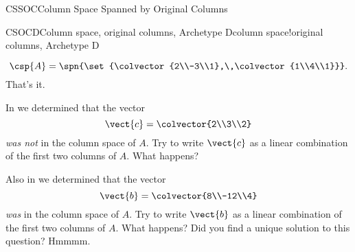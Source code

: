 \begin{subsect}{CSSOC}{Column Space Spanned by Original Columns}
\begin{example}{CSOCD}{Column space, original columns, Archetype D}{column space!original columns,  Archetype D}
\begin{para}
\begin{equation*}
\csp{A}=\spn{\set{\colvector{2\\-3\\1},\,\colvector{1\\4\\1}}}.
\end{equation*}
%
That's it.\end{para}
%
\begin{para}In  we determined that the vector
%
\begin{equation*}
\vect{c}=\colvector{2\\3\\2}
\end{equation*}
%
{\em was not} in the column space of $A$.  Try to write $\vect{c}$ as a linear combination of the first two columns of $A$.  What happens?\end{para}
%
\begin{para}Also in  we determined that the vector
%
\begin{equation*}
\vect{b}=\colvector{8\\-12\\4}
\end{equation*}
%
{\em was} in the column space of $A$.  Try to write $\vect{b}$ as a linear combination of the first two columns of $A$.  What happens?  Did you find a unique solution to this question?  Hmmmm.\end{para}
%
\end{example}
%
%
\end{subsect}
%
